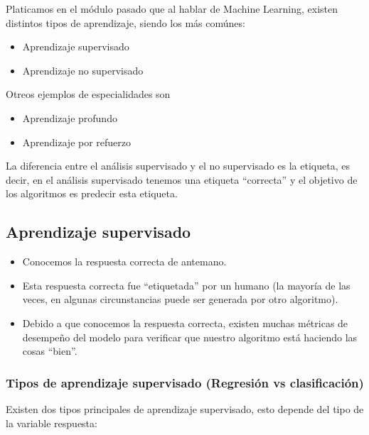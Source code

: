 \documentclass[
]{book}
\providecommand{\tightlist}{%
  \setlength{\itemsep}{0pt}\setlength{\parskip}{0pt}}
\begin{document}
Platicamos en el módulo pasado que al hablar de Machine Learning, existen distintos tipos de aprendizaje, siendo los más comúnes:

\begin{itemize}
\tightlist
\item
  Aprendizaje supervisado
\item
  Aprendizaje no supervisado
\end{itemize}

Otreos ejemplos de especialidades son

\begin{itemize}
\tightlist
\item
  Aprendizaje profundo
\item
  Aprendizaje por refuerzo
\end{itemize}

La diferencia entre el análisis supervisado y el no supervisado es la etiqueta, es decir, en el análisis supervisado tenemos una etiqueta ``correcta'' y el objetivo de los algoritmos es predecir esta etiqueta.

\hypertarget{aprendizaje-supervisado}{%
\subsection{Aprendizaje supervisado}\label{aprendizaje-supervisado}}

\begin{itemize}
\item
  Conocemos la respuesta correcta de antemano.
\item
  Esta respuesta correcta fue ``etiquetada'' por un humano (la mayoría de las veces, en algunas circunstancias puede ser generada por otro algoritmo).
\item
  Debido a que conocemos la respuesta correcta, existen muchas métricas de desempeño del modelo para verificar que nuestro algoritmo está haciendo las cosas ``bien''.
\end{itemize}

\hypertarget{tipos-de-aprendizaje-supervisado-regresiuxf3n-vs-clasificaciuxf3n}{%
\subsubsection{Tipos de aprendizaje supervisado (Regresión vs clasificación)}\label{tipos-de-aprendizaje-supervisado-regresiuxf3n-vs-clasificaciuxf3n}}

Existen dos tipos principales de aprendizaje supervisado, esto depende del tipo de la variable respuesta:
\end{document}
